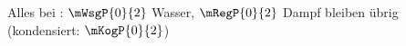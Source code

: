 Alles bei \TsO: $\mWsgP{0}{2}$ Wasser, $\mRegP{0}{2}$ Dampf bleiben übrig (kondensiert: $\mKogP{0}{2}$)
